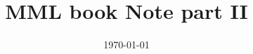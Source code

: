 \documentclass[12pt, a4paper]{book}
\begin{document}
	\title{MML book Note part II}
	\date{\today}
	\maketitle
	\tableofcontents
	\setcounter{chapter}{7}
	
	
\end{document}
